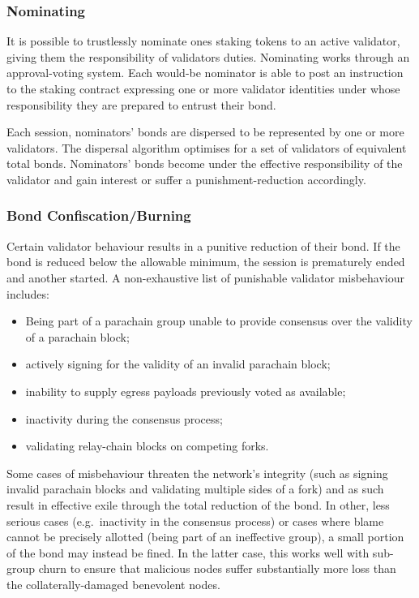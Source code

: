 \documentclass[9pt,oneside]{amsart}
\makeatletter
\newcommand*\eg{e.g.\@\xspace}
\makeatother
\begin{document}
\begin{multicols}{2}
\subsubsection{Nominating}
\label{nominating}

 It is possible to trustlessly nominate ones staking tokens to an active validator, giving them the responsibility of validators duties. Nominating works through an approval-voting system. Each would-be nominator is able to post an instruction to the staking contract expressing one or more validator identities under whose responsibility they are prepared to entrust their bond.

 Each session, nominators' bonds are dispersed to be represented by one or more validators. The dispersal algorithm optimises for a set of validators of equivalent total bonds. Nominators' bonds become under the effective responsibility of the validator and gain interest or suffer a punishment-reduction accordingly.

\subsubsection{Bond Confiscation/Burning}
\label{bond-confiscationburning}

 Certain validator behaviour results in a punitive reduction of their bond. If the bond is reduced below the allowable minimum, the session is prematurely ended and another started. A non-exhaustive list of punishable validator misbehaviour includes:

\begin{itemize}
\item Being part of a parachain group unable to provide consensus over the validity of a parachain block;
\item actively signing for the validity of an invalid parachain block;
\item inability to supply egress payloads previously voted as available;
\item inactivity during the consensus process;
\item validating relay-chain blocks on competing forks.
\end{itemize}

 Some cases of misbehaviour threaten the network's integrity (such as signing invalid parachain blocks and validating multiple sides of a fork) and as such result in effective exile through the total reduction of the
bond. In other, less serious cases (\eg~inactivity in the consensus process) or cases where blame cannot be precisely allotted (being part of an ineffective group), a small portion of the bond may instead be fined. In the latter case, this works well with sub-group churn to ensure that malicious nodes suffer substantially more loss than the collaterally-damaged benevolent nodes.


\end{multicols}
\end{document}
